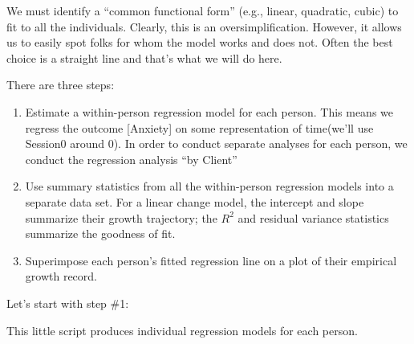 \documentclass[
  english,
]{book}
\newenvironment{Shaded}{\begin{snugshade}}{\end{snugshade}}
\newcommand{\AttributeTok}[1]{\textcolor[rgb]{0.77,0.63,0.00}{#1}}
\newcommand{\ControlFlowTok}[1]{\textcolor[rgb]{0.13,0.29,0.53}{\textbf{#1}}}
\newcommand{\FunctionTok}[1]{\textcolor[rgb]{0.00,0.00,0.00}{#1}}
\newcommand{\NormalTok}[1]{#1}
\newcommand{\OtherTok}[1]{\textcolor[rgb]{0.56,0.35,0.01}{#1}}
\newcommand{\SpecialCharTok}[1]{\textcolor[rgb]{0.00,0.00,0.00}{#1}}
\providecommand{\tightlist}{%
  \setlength{\itemsep}{0pt}\setlength{\parskip}{0pt}}
\begin{document}
We must identify a ``common functional form'' (e.g., linear, quadratic, cubic) to fit to all the individuals. Clearly, this is an oversimplification. However, it allows us to easily spot folks for whom the model works and does not. Often the best choice is a straight line and that's what we will do here.

There are three steps:

\begin{enumerate}
\def\labelenumi{\arabic{enumi}.}
\tightlist
\item
  Estimate a within-person regression model for each person. This means we regress the outcome {[}Anxiety{]} on some representation of time(we'll use Session0 around 0). In order to conduct separate analyses for each person, we conduct the regression analysis ``by Client''
\item
  Use summary statistics from all the within-person regression models into a separate data set. For a linear change model, the intercept and slope summarize their growth trajectory; the \(R^2\) and residual variance statistics summarize the goodness of fit.
\item
  Superimpose each person's fitted regression line on a plot of their empirical growth record.
\end{enumerate}

Let's start with step \#1:

This little script produces individual regression models for each person.

\begin{Shaded}
\end{Shaded}
\end{document}
